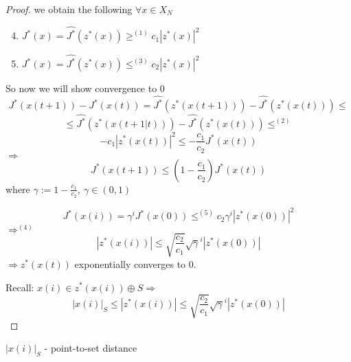 \begin{Theorem}
\begin{proof}
we obtain the following $\forall x \in X_N$
\begin{enumerate}
\setcounter{enumi}{3}
\item $J^*(x) = \hat{J^*}(z^*(x)) \geq^{(1)} c_1|z^*(x)|^2$
\item $J^*(x) = \hat{J^*}(z^*(x)) \leq^{(3)} c_2|z^*(x)|^2$
\end{enumerate}

So now we will show convergence to $0$
\begin{equation*}
J^*(x(t+1)) - J^*(x(t)) = \hat{J^*}(z^*(x(t+1))) - \hat{J^*}(z^*(x(t))) \leq
\end{equation*}
\begin{equation*}
\leq \hat{J^*}(z^*(x(t+1|t))) - \hat{J^*}(z^*(x(t))) \leq^{(2)}
\end{equation*}
\begin{equation*}
-c_1|z^*(x(t))|^2 \leq - \frac{c_1}{c_2}J^*(x(t))
\end{equation*}
$\Rightarrow$
\begin{equation*}
J^*(x(t+1)) \leq (1 - \frac{c_1}{c_2})J^*(x(t))
\end{equation*} 
where $\gamma := 1 - \frac{c_1}{c_2}, \ \gamma \in (0,1)$

\begin{equation*}
J^*(x(i)) = \gamma^iJ^*(x(0)) \leq^{(5)} c_2\gamma^i|z^*(x(0))|^2
\end{equation*}
$\Rightarrow^{(4)}$
\begin{equation*}
|z^*(x(i))| \leq \sqrt{\frac{c_2}{c_1}}\sqrt{\gamma}^i|z^*(x(0))|
\end{equation*}
$\Rightarrow z^*(x(t))$ exponentially converges to $0$.

Recall: $x(i) \in z^*(x(i)) \oplus S \Rightarrow$
\begin{equation*}
|x(i)|_S \leq |z^*(x(i))| \leq \sqrt{\frac{c_2}{c_1}}\sqrt{\gamma}^i|z^*(x(0))|
\end{equation*}
\end{proof}
\end{Theorem}

$|x(i)|_S$ - point-to-set distance

